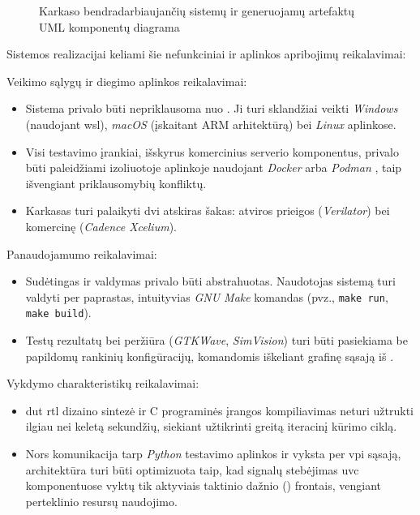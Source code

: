 \begin{figure}[H]
	 
	\caption{Karkaso bendradarbiaujančių sistemų ir generuojamų artefaktų UML komponentų diagrama}
	\label{fig:uml_realization_architecture}
\end{figure}

Sistemos realizacijai keliami šie nefunkciniai ir aplinkos apribojimų reikalavimai:

Veikimo sąlygų ir diegimo aplinkos reikalavimai:
\begin{itemize}
	\item Sistema privalo būti nepriklausoma nuo . Ji turi sklandžiai veikti \textit{Windows} (naudojant \gls{wsl}), \textit{macOS} (įskaitant ARM arhitektūrą) bei \textit{Linux} aplinkose.
	\item Visi testavimo įrankiai, išskyrus komercinius serverio komponentus, privalo būti paleidžiami izoliuotoje aplinkoje naudojant \textit{Docker} arba \textit{Podman} , taip išvengiant priklausomybių konfliktų.
	\item Karkasas turi palaikyti dvi atskiras  šakas: atviros prieigos (\textit{Verilator}) bei komercinę (\textit{Cadence Xcelium}).
\end{itemize}

Panaudojamumo reikalavimai:
\begin{itemize}
	\item Sudėtingas  ir  valdymas privalo būti abstrahuotas. Naudotojas sistemą turi valdyti per paprastas, intuityvias \textit{GNU Make} komandas (pvz., \texttt{make run}, \texttt{make build}).
	\item Testų rezultatų bei  peržiūra (\textit{GTKWave}, \textit{SimVision}) turi būti pasiekiama be papildomų rankinių konfigūracijų, komandomis iškeliant grafinę sąsają iš .
\end{itemize}

Vykdymo charakteristikų reikalavimai:
\begin{itemize}
	\item \gls{dut} \gls{rtl} dizaino sintezė ir C programinės įrangos kompiliavimas neturi užtrukti ilgiau nei keletą sekundžių, siekiant užtikrinti greitą iteracinį kūrimo ciklą.
	\item Nors komunikacija tarp \textit{Python} testavimo aplinkos ir  vyksta per \gls{vpi} sąsają, architektūra turi būti optimizuota taip, kad signalų stebėjimas \gls{uvc} komponentuose vyktų tik aktyviais taktinio dažnio () frontais, vengiant perteklinio resursų naudojimo.
\end{itemize}

